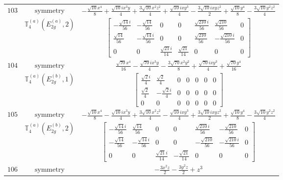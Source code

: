 \documentclass[fleqn,8pt,landscape]{jsarticle}
\begin{document}
\begin{longtable}{ccc}
$ 103 $ & $ \text{symmetry} $ & $ - \frac{\sqrt{10} x^{4}}{8} + \frac{\sqrt{10} i x^{3} y}{4} + \frac{3 \sqrt{10} x^{2} z^{2}}{4} + \frac{\sqrt{10} i x y^{3}}{4} - \frac{3 \sqrt{10} i x y z^{2}}{2} + \frac{\sqrt{10} y^{4}}{8} - \frac{3 \sqrt{10} y^{2} z^{2}}{4} $ \\
$  $ & $ \mathbb{T}_{4}^{(a)}(E_{2g}^{(a)},2) $ & $ \begin{bmatrix} - \frac{\sqrt{14} i}{56} & - \frac{\sqrt{14}}{56} & 0 & 0 & \frac{\sqrt{210} i}{56} & \frac{\sqrt{210}}{56} & 0 \\ \frac{\sqrt{14}}{56} & - \frac{\sqrt{14} i}{56} & 0 & 0 & \frac{\sqrt{210}}{56} & - \frac{\sqrt{210} i}{56} & 0 \\ 0 & 0 & \frac{\sqrt{21} i}{14} & \frac{\sqrt{21}}{14} & 0 & 0 & 0 \end{bmatrix} $ \\ \hline
$ 104 $ & $ \text{symmetry} $ & $ \frac{\sqrt{70} x^{4}}{16} - \frac{\sqrt{70} i x^{3} y}{4} - \frac{3 \sqrt{70} x^{2} y^{2}}{8} + \frac{\sqrt{70} i x y^{3}}{4} + \frac{\sqrt{70} y^{4}}{16} $ \\
$  $ & $ \mathbb{T}_{4}^{(a)}(E_{2g}^{(b)},1) $ & $ \begin{bmatrix} \frac{\sqrt{2} i}{4} & \frac{\sqrt{2}}{4} & 0 & 0 & 0 & 0 & 0 \\ \frac{\sqrt{2}}{4} & - \frac{\sqrt{2} i}{4} & 0 & 0 & 0 & 0 & 0 \\ 0 & 0 & 0 & 0 & 0 & 0 & 0 \end{bmatrix} $ \\ \hline
$ 105 $ & $ \text{symmetry} $ & $ - \frac{\sqrt{10} x^{4}}{8} - \frac{\sqrt{10} i x^{3} y}{4} + \frac{3 \sqrt{10} x^{2} z^{2}}{4} - \frac{\sqrt{10} i x y^{3}}{4} + \frac{3 \sqrt{10} i x y z^{2}}{2} + \frac{\sqrt{10} y^{4}}{8} - \frac{3 \sqrt{10} y^{2} z^{2}}{4} $ \\
$  $ & $ \mathbb{T}_{4}^{(a)}(E_{2g}^{(b)},2) $ & $ \begin{bmatrix} - \frac{\sqrt{14} i}{56} & \frac{\sqrt{14}}{56} & 0 & 0 & \frac{\sqrt{210} i}{56} & - \frac{\sqrt{210}}{56} & 0 \\ - \frac{\sqrt{14}}{56} & - \frac{\sqrt{14} i}{56} & 0 & 0 & - \frac{\sqrt{210}}{56} & - \frac{\sqrt{210} i}{56} & 0 \\ 0 & 0 & \frac{\sqrt{21} i}{14} & - \frac{\sqrt{21}}{14} & 0 & 0 & 0 \end{bmatrix} $ \\ \hline
$ 106 $ & $ \text{symmetry} $ & $ - \frac{3 x^{2} z}{2} - \frac{3 y^{2} z}{2} + z^{3} $ \\

\end{longtable}
\end{document}
